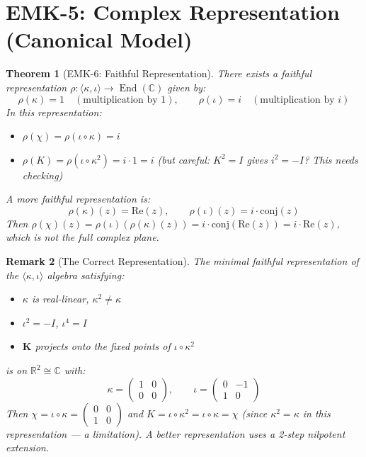 \documentclass[12pt, oneside]{article}
\newtheorem{theorem}{Theorem}[section]
\newtheorem{remark}[theorem]{Remark}
\newcommand{\K}{\mathbf{K}}
\newcommand{\End}{\mathop{\mathrm{End}}}
\begin{document}
\section{EMK-5: Complex Representation (Canonical Model)}

\begin{theorem}[EMK-6: Faithful Representation]
There exists a faithful representation $\rho: \langle \kappa, \iota \rangle \rightarrow \End(\mathbb{C})$ given by:
\[
\rho(\kappa) = 1 \quad (\text{multiplication by } 1),\qquad
\rho(\iota) = i \quad (\text{multiplication by } i)
\]
In this representation:
\begin{itemize}
    \item $\rho(\chi) = \rho(\iota \circ \kappa) = i$
    \item $\rho(K) = \rho(\iota \circ \kappa^2) = i \cdot 1 = i$ (but careful: $K^2 = I$ gives $i^2 = -I$? This needs checking)
\end{itemize}
A more faithful representation is:
\[
\rho(\kappa)(z) = \mathrm{Re}(z),\qquad
\rho(\iota)(z) = i \cdot \mathrm{conj}(z)
\]
Then $\rho(\chi)(z) = \rho(\iota)(\rho(\kappa)(z)) = i \cdot \mathrm{conj}(\mathrm{Re}(z)) = i \cdot \mathrm{Re}(z)$, which is not the full complex plane.
\end{theorem}

\begin{remark}[The Correct Representation]
The minimal faithful representation of the $\langle \kappa, \iota \rangle$ algebra satisfying:
\begin{itemize}
    \item $\kappa$ is real-linear, $\kappa^2 \neq \kappa$
    \item $\iota^2 = -I$, $\iota^4 = I$
    \item $\K$ projects onto the fixed points of $\iota \circ \kappa^2$
\end{itemize}
is on $\mathbb{R}^2 \cong \mathbb{C}$ with:
\[
\kappa = \begin{pmatrix} 1 & 0 \\ 0 & 0 \end{pmatrix},\qquad
\iota = \begin{pmatrix} 0 & -1 \\ 1 & 0 \end{pmatrix}
\]
Then $\chi = \iota \circ \kappa = \begin{pmatrix} 0 & 0 \\ 1 & 0 \end{pmatrix}$ and $K = \iota \circ \kappa^2 = \iota \circ \kappa = \chi$ (since $\kappa^2 = \kappa$ in this representation — a limitation). A better representation uses a 2-step nilpotent extension.
\end{remark}
\end{document}
